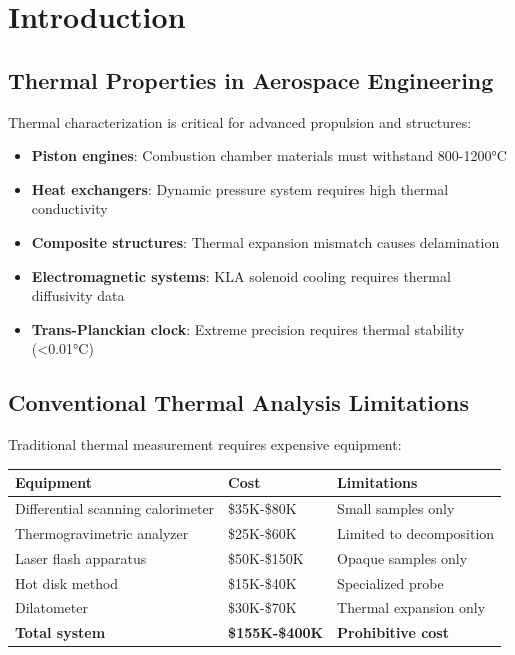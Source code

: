 \documentclass[12pt,a4paper]{article}
\begin{document}
\section{Introduction}

\subsection{Thermal Properties in Aerospace Engineering}

Thermal characterization is critical for advanced propulsion and structures:

\begin{itemize}
\item \textbf{Piston engines}: Combustion chamber materials must withstand 800-1200°C
\item \textbf{Heat exchangers}: Dynamic pressure system requires high thermal conductivity
\item \textbf{Composite structures}: Thermal expansion mismatch causes delamination
\item \textbf{Electromagnetic systems}: KLA solenoid cooling requires thermal diffusivity data
\item \textbf{Trans-Planckian clock}: Extreme precision requires thermal stability (<0.01°C)
\end{itemize}

\subsection{Conventional Thermal Analysis Limitations}

Traditional thermal measurement requires expensive equipment:

\begin{center}
\begin{tabular}{|l|l|l|}
\hline
\textbf{Equipment} & \textbf{Cost} & \textbf{Limitations} \\
\hline
Differential scanning calorimeter & \$35K-\$80K & Small samples only \\
Thermogravimetric analyzer & \$25K-\$60K & Limited to decomposition \\
Laser flash apparatus & \$50K-\$150K & Opaque samples only \\
Hot disk method & \$15K-\$40K & Specialized probe \\
Dilatometer & \$30K-\$70K & Thermal expansion only \\
\hline
\textbf{Total system} & \textbf{\$155K-\$400K} & \textbf{Prohibitive cost} \\
\hline
\end{tabular}
\end{center}
\end{document}
